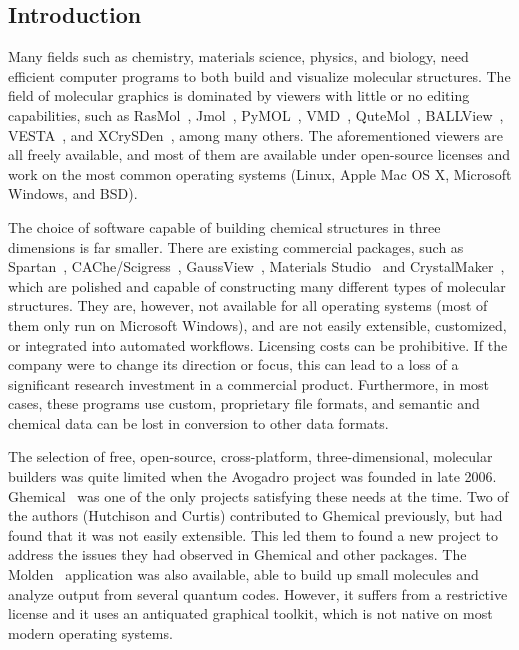 \documentclass[10pt]{bmc_article}
\newenvironment{bmcformat}{\begin{raggedright}
  \baselineskip20pt\sloppy\setboolean{publ}{false}}{\end{raggedright}
  \baselineskip20pt\sloppy}
\begin{document}
\begin{bmcformat}
\begin{abstract}
\end{abstract}


\section*{Introduction}

Many fields such as chemistry, materials science, physics, and biology, need
efficient computer programs to both build and visualize molecular structures.
The field of molecular graphics is dominated by viewers with little or no
editing capabilities, such as RasMol~\cite{RasMol}, Jmol~\cite{JMol},
PyMOL~\cite{PyMOL}, VMD~\cite{VMD}, QuteMol~\cite{QuteMol},
BALLView~\cite{BALLView}, VESTA~\cite{vesta3}, and
XCrySDen~\cite{xcrysden1}\cite{xcrysden2}, among many others. The aforementioned
viewers are all freely available, and most of them are available under
open-source licenses and work on the most common operating systems (Linux, Apple
Mac OS X, Microsoft Windows, and BSD).

The choice of software capable of building chemical structures in
three dimensions is far smaller.
There are existing commercial packages, such as
Spartan~\cite{Spartan}, CAChe/Scigress~\cite{CAChe},
GaussView~\cite{GaussView}, Materials Studio~\cite{Accelrys} and
CrystalMaker~\cite{CrystalMaker}, which are polished and capable of
constructing many different types of molecular structures. They are,
however, not available for all operating systems (most of them only
run on Microsoft Windows), and are not easily extensible, customized,
or integrated into automated workflows. Licensing costs can be
prohibitive. If the company were to change its direction or focus, this
can lead to a loss of a significant research investment in a commercial
product. Furthermore, in most cases, these programs use custom,
proprietary file formats, and semantic and chemical data can be lost in
conversion to other data formats.

The selection of free, open-source, cross-platform, three-dimensional,
molecular builders was quite limited when the Avogadro project was founded in late 2006.
Ghemical~\cite{Ghemical} was one of the only projects satisfying these needs at
the time. Two of the authors (Hutchison and Curtis) contributed to Ghemical
previously, but had found that it was not easily extensible. This led them to
found a new project to address the issues they had observed in Ghemical
and other packages. The Molden~\cite{Molden} application was also available,
able to build up small molecules and analyze output from several quantum codes.
However, it suffers from a restrictive license and it uses an antiquated graphical
toolkit, which is not native on most modern operating systems.


\end{bmcformat}
\end{document}
